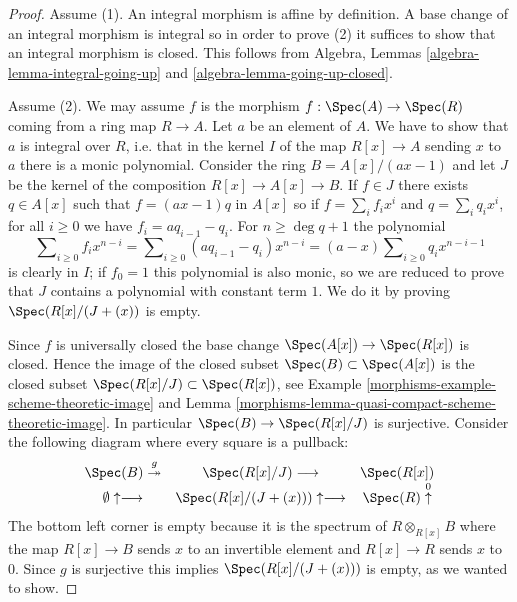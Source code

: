 \begin{proof}

Assume (1). An integral morphism is affine by definition.
A base change of an integral morphism is integral so in order to prove (2)
it suffices to show that an integral morphism is closed.
This follows from Algebra, Lemmas \ref{algebra-lemma-integral-going-up}
and \ref{algebra-lemma-going-up-closed}.

\medskip\noindent
Assume (2). We may assume $f$ is the morphism
$f : \Spec(A) \to \Spec(R)$ coming from a ring map
$R \to A$. Let $a$ be an element of $A$. We have to show
that $a$ is integral over $R$, i.e. that in the kernel
$I$ of the map $R[x] \to A$ sending $x$ to $a$ there is
a monic polynomial. Consider the ring
$B = A[x]/(ax -1)$ and let $J$ be the kernel of the
composition $R[x]\to A[x] \to B$. If $f\in J$ there exists
$q\in A[x]$ such that $f = (ax-1)q$ in $A[x]$ so if
$f = \sum_i f_ix^i$ and $q = \sum_iq_ix^i$, for all $i \geq 0$
we have $f_i = aq_{i-1} - q_i$. For $n \geq \deg q + 1$ the polynomial
$$
\sum\nolimits_{i \geq 0} f_i x^{n - i} =
\sum\nolimits_{i \geq 0} (a q_{i - 1} - q_i) x^{n - i} =
(a - x) \sum\nolimits_{i \geq 0} q_i x^{n - i - 1}
$$
is clearly in $I$; if $f_0 = 1$ this polynomial is also monic, so we
are reduced to prove that $J$ contains a polynomial with constant term $1$.
We do it by proving $\Spec(R[x]/(J + (x))$ is empty.


\medskip\noindent
Since $f$ is universally closed the base change $\Spec(A[x]) \to \Spec(R[x])$
is closed. Hence the image of the closed subset $\Spec(B) \subset \Spec(A[x])$
is the closed subset $\Spec(R[x]/J) \subset \Spec(R[x])$, see
Example \ref{morphisms-example-scheme-theoretic-image} and
Lemma \ref{morphisms-lemma-quasi-compact-scheme-theoretic-image}.
In particular $\Spec(B) \to \Spec(R[x]/J)$ is surjective. Consider the
following diagram where every square is a pullback:
$$
\begin{array}{ccc}\Spec(B) \overset{g}{\twoheadrightarrow} & \Spec(R[x]/J)  \longrightarrow & \Spec(R[x]) \\ \emptyset \uparrow\longrightarrow & \Spec(R[x]/(J + (x)))\uparrow\longrightarrow & \Spec(R) \overset{0}{\uparrow}\end{array}
$$
The bottom left corner is empty because it is the spectrum of
$R\otimes_{R[x]} B$ where the map $R[x]\to B$ sends $x$ to an
invertible element and $R[x]\to R$ sends $x$ to $0$. Since $g$
is surjective this implies $\Spec(R[x]/(J + (x)))$ is empty, as
we wanted to show.
\end{proof}

